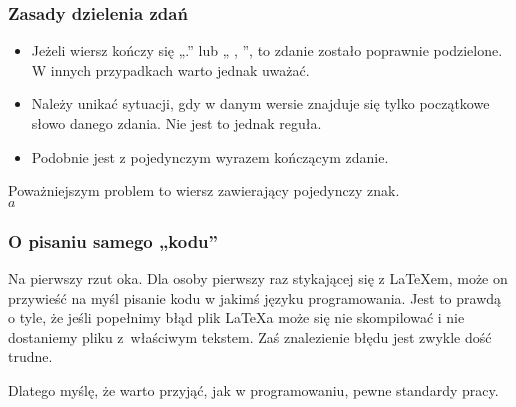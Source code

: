\documentclass[10pt,t]{beamer}
\begin{document}
\begin{frame}
  \frametitle{Zasady dzielenia zdań}


  \begin{itemize}
    \RaggedRight

  \item Jeżeli wiersz kończy się „.” lub „ , ”, to zdanie zostało
    poprawnie podzielone. W innych przypadkach warto jednak uważać.

  \item Należy unikać sytuacji, gdy w danym wersie znajduje się
    tylko początkowe słowo danego zdania. Nie jest to jednak reguła.

  \item Podobnie jest z pojedynczym wyrazem kończącym zdanie.

  \end{itemize}

  Poważniejszym problem to wiersz zawierający pojedynczy
  znak. \\
  $a$

\end{frame}





\begin{frame}
  \frametitle{O pisaniu samego „kodu”}


  Na pierwszy rzut oka.
  Dla osoby pierwszy raz stykającej się z \LaTeX em, może on
  przywieść na myśl pisanie kodu w jakimś języku programowania.
  Jest to prawdą o tyle, że jeśli popełnimy błąd plik
  \LaTeX a może się nie skompilować i nie dostaniemy pliku
  z~właściwym tekstem. Zaś znalezienie błędu jest zwykle dość trudne.

  Dlatego myślę, że warto przyjąć, jak w programowaniu, pewne
  standardy pracy.

\end{frame}
\end{document}
